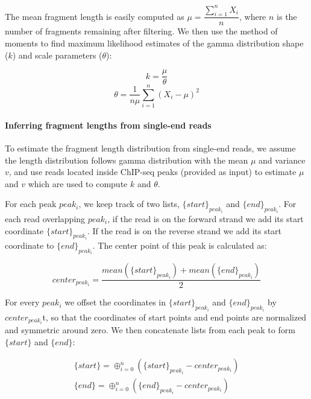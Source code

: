 \documentclass[12pt]{article}
\begin{document}
The mean fragment length is easily computed as $\mu = \dfrac{\sum_{i=1}^{n}X_i}{n}$, where $n$ is the number of fragments remaining after filtering. We then use the method of moments to find maximum likelihood estimates of the gamma distribution shape ($k$) and scale parameters ($\theta$):

\begin{equation}
  k =  \dfrac{\mu}{\theta}
\end{equation}
\begin{equation}
  \theta = \dfrac{1}{n\mu}\sum_{i=1}^{n}(X_i - \mu)^2
\end{equation}

\paragraph{Inferring fragment lengths from single-end reads}
To estimate the fragment length distribution from single-end reads, we assume the length distribution follows gamma distribution with the mean $\mu$ and variance $v$, and use reads located inside ChIP-seq peaks (provided as input) to estimate $\mu$ and $v$ which are used to compute $k$ and $\theta$.

For each peak $peak_i$, we keep track of two lists, $\{start\}_{peak_i}$ and $\{end\}_{peak_i}$.
For each read overlapping $peak_i$, if the read is on the forward strand we add its start coordinate $\{start\}_{peak_i}$.
If the read is on the reverse strand we add its start coordinate to $\{end\}_{peak_i}$.
The center point of this peak is calculated as:

\begin{equation} \label{eq:center}
  center_{peak_i} = \frac{mean(\{start\}_{peak_i}) + mean(\{end\}_{peak_i})}{2}
\end{equation}
  
For every $peak_i$ we offset the coordinates in $\{start\}_{peak_i}$ and $\{end\}_{peak_i}$ by $center_{peak_i}$t, so that the coordinates of start points and end points are normalized and symmetric around zero.
We then concatenate lists from each peak to form $\{start\}$ and $\{end\}$:

\begin{equation} \label{eq:concat}
  \begin{array}{c}
  \{start\} = \oplus_{i=0}^{n} (\{start\}_{peak_i} - center_{peak_i})\\
  \{end\} = \oplus_{i=0}^{n} (\{end\}_{peak_i} - center_{peak_i})
  \end{array}
\end{equation}
\end{document}
